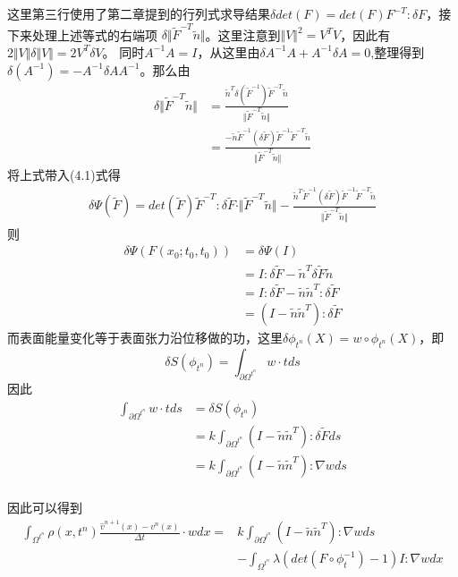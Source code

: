 这里第三行使用了第二章提到的行列式求导结果$\delta det(F) = det(F)F^{-T}:\delta F$，接下来处理上述等式的右端项
$\delta \Vert \tilde{F}^{-T}\tilde{n}\Vert$。这里注意到$\Vert V \Vert^2 = V^TV$，因此有$2\Vert V\Vert \delta \Vert V \Vert = 2V^T\delta V$。
同时$A^{-1}A = I$，从这里由$\delta A^{-1} A + A^{-1}\delta A = 0$,整理得到$\delta (A^{-1}) = - A^{-1}\delta A A^{-1}$。那么由
\begin{align*}
    \delta \Vert \tilde{F}^{-T}\tilde{n}\Vert &= \frac{\tilde{n}^{T}\delta(\tilde{F}^{-1})\tilde{F}^{-T}\tilde{n}}{\Vert \tilde{F}^{-T}\tilde{n}\Vert}\\
    &= \frac{-\tilde{n}\tilde{F}^{-1}(\delta \tilde{F})\tilde{F}^{-1}\tilde{F}^{-T}\tilde{n}}{\Vert \tilde{F}^{-T}\tilde{n} \Vert}
\end{align*}
将上式带入(4.1)式得
\begin{align*}
    \delta \Psi(\tilde{F}) = det(\tilde{F})\tilde{F}^{-T}:\delta \tilde{F} \cdot \Vert \tilde{F}^{-T}\tilde{n}\Vert - \frac{\tilde{n}^T\tilde{F}^{-1}(\delta \tilde{F})\tilde{F}^{-1}\tilde{F}^{-T}\tilde{n}}{\Vert \tilde{F}^{-T}\tilde{n} \Vert}
\end{align*}
则
\begin{align*}
    \delta \Psi (F(x_0;t_0,t_0)) &= \delta \Psi(I)\\ 
    &= I:\delta \tilde{F} - \tilde{n}^T\delta \tilde{F} \tilde{n}\\
    &= I:\delta \tilde{F} - \tilde{n}\tilde{n}^T:\delta \tilde{F}\\
    &= (I - \tilde{n}\tilde{n}^T):\delta \tilde{F}
\end{align*}
而表面能量变化等于表面张力沿位移做的功，这里$\delta \phi_{t^n} (X) = w\circ\phi_{t^n}(X)$，即
$$\delta S(\phi_{t^n}) = \int_{\partial \Omega^{t^n}} w\cdot t ds$$
因此
\begin{align*}
    \int_{\partial \Omega^{t^n}} w\cdot t ds &= \delta S(\phi_{t^n})\\
    &= k\int_{\partial \Omega^{t^n}} (I - \tilde{n}\tilde{n}^{T}):\delta \tilde{F}ds\\
    &= k\int_{\partial \Omega^{t^n}} (I - \tilde{n}\tilde{n}^{T}):\nabla w ds\\
\end{align*}

因此可以得到
\begin{align}
    \int_{\Omega^{t^n}}\rho(x,t^n)\frac{\hat{v}^{n+1}(x) - v^n(x)}{\Delta t}\cdot wdx = &k\int_{\partial \Omega^{t^n}} (I - \tilde{n}\tilde{n}^T):\nabla w ds\nonumber\\
    & -\int_{\Omega^{t^n}}\lambda (det(F\circ \phi_t^{-1}) - 1)I:\nabla w dx
\end{align}
